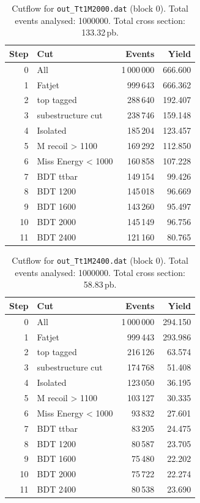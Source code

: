\documentclass{article}
\begin{document}
\begin{table}[H]
\centering
\begin{tabular}{r l r r}
\toprule
Step & Cut & Events & Yield \\
\midrule
0 & All & 1\,000\,000 & 666.600 \\
1 & Fatjet & 999\,643 & 666.362 \\
2 & top tagged & 288\,640 & 192.407 \\
3 & subestructure cut & 238\,746 & 159.148 \\
4 & Isolated & 185\,204 & 123.457 \\
5 & M recoil > 1100 & 169\,292 & 112.850 \\
6 & Miss Energy < 1000 & 160\,858 & 107.228 \\
7 & BDT ttbar & 149\,154 & 99.426 \\
8 & BDT 1200 & 145\,018 & 96.669 \\
9 & BDT 1600 & 143\,260 & 95.497 \\
10 & BDT 2000 & 145\,149 & 96.756 \\
11 & BDT 2400 & 121\,160 & 80.765 \\
\bottomrule
\end{tabular}
\caption{Cutflow for \texttt{out\_Tt1M2000.dat} (block 0). Total events analysed: 1000000. Total cross section: 133.32\,pb.}
\label{tab:cutflow-out-Tt1M2000-dat}
\end{table}

\begin{table}[H]
\centering
\begin{tabular}{r l r r}
\toprule
Step & Cut & Events & Yield \\
\midrule
0 & All & 1\,000\,000 & 294.150 \\
1 & Fatjet & 999\,443 & 293.986 \\
2 & top tagged & 216\,126 & 63.574 \\
3 & subestructure cut & 174\,768 & 51.408 \\
4 & Isolated & 123\,050 & 36.195 \\
5 & M recoil > 1100 & 103\,127 & 30.335 \\
6 & Miss Energy < 1000 & 93\,832 & 27.601 \\
7 & BDT ttbar & 83\,205 & 24.475 \\
8 & BDT 1200 & 80\,587 & 23.705 \\
9 & BDT 1600 & 75\,480 & 22.202 \\
10 & BDT 2000 & 75\,722 & 22.274 \\
11 & BDT 2400 & 80\,538 & 23.690 \\
\bottomrule
\end{tabular}
\caption{Cutflow for \texttt{out\_Tt1M2400.dat} (block 0). Total events analysed: 1000000. Total cross section: 58.83\,pb.}
\label{tab:cutflow-out-Tt1M2400-dat}
\end{table}
\end{document}
